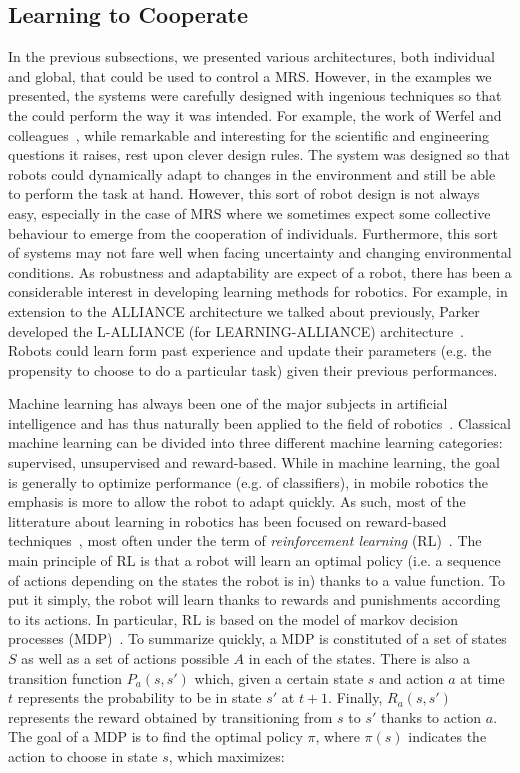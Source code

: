   \subsection{Learning to Cooperate}

    In the previous subsections, we presented various architectures, both individual and global, that could be used to control a MRS. However, in the examples we presented, the systems were carefully designed with ingenious techniques so that the could perform the way it was intended. For example, the work of Werfel and colleagues~\cite{Werfel2014}, while remarkable and interesting for the scientific and engineering questions it raises, rest upon clever design rules. The system was designed so that robots could dynamically adapt to changes in the environment and still be able to perform the task at hand. However, this sort of robot design is not always easy, especially in the case of MRS where we sometimes expect some collective behaviour to emerge from the cooperation of individuals. Furthermore, this sort of systems may not fare well when facing uncertainty and changing environmental conditions. As robustness and adaptability are expect of a robot, there has been a considerable interest in developing learning methods for robotics. For example, in extension to the ALLIANCE architecture we talked about previously, Parker developed the L-ALLIANCE (for LEARNING-ALLIANCE) architecture~\cite{Parker1994}. Robots could learn form past experience and update their parameters (e.g. the propensity to choose to do a particular task) given their previous performances.

    Machine learning has always been one of the major subjects in artificial intelligence and has thus naturally been applied to the field of robotics~\cite{Hertzberg2008}. Classical machine learning can be divided into three different machine learning categories: supervised, unsupervised and reward-based. While in machine learning, the goal is generally to optimize performance (e.g. of classifiers), in mobile robotics the emphasis is more to allow the robot to adapt quickly. As such, most of the litterature about learning in robotics has been focused on reward-based techniques~\cite{Mataric2008}, most often under the term of \emph{reinforcement learning} (RL)~\cite{Sutton1998}. The main principle of RL is that a robot will learn an optimal policy (i.e. a sequence of actions depending on the states the robot is in) thanks to a value function. To put it simply, the robot will learn thanks to rewards and punishments according to its actions. In particular, RL is based on the model of markov decision processes (MDP)~\cite{Bellman1957}. To summarize quickly, a MDP is constituted of a set of states $S$ as well as a set of actions possible $A$ in each of the states. There is also a transition function $P_{a}(s,s')$ which, given a certain state $s$ and action $a$ at time $t$ represents the probability to be in state $s'$ at $t+1$. Finally, $R_{a}(s,s')$ represents the reward obtained by transitioning from $s$ to $s'$ thanks to action $a$. The goal of a MDP is to find the optimal policy $\pi$, where $\pi(s)$ indicates the action to choose in state $s$, which maximizes:

